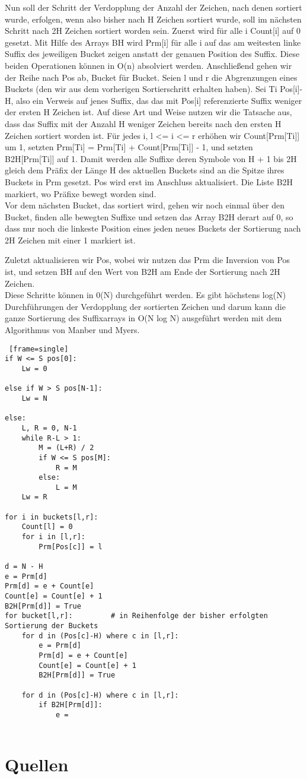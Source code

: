 \documentclass[twoside]{article}
\begin{document}
Nun soll der Schritt der Verdopplung der Anzahl der Zeichen, nach denen sortiert
wurde, erfolgen, wenn also bisher nach H Zeichen sortiert wurde, soll im nächsten
Schritt nach 2H Zeichen sortiert worden sein.
Zuerst wird für alle i Count[i] auf 0 gesetzt. Mit Hilfe des Arrays BH wird Prm[i]
für alle i auf das am weitesten linke Suffix des jeweiligen Bucket zeigen anstatt
der genauen Position des Suffix. Diese beiden Operationen können in O(n) absolviert werden.
Anschließend gehen wir der Reihe nach Pos ab, Bucket für Bucket. Seien l und r
die Abgrenzungen eines Buckets (den wir aus dem vorherigen Sortierschritt erhalten haben).
Sei Ti Pos[i]-H, also ein Verweis auf jenes Suffix, das das mit Pos[i] referenzierte
Suffix weniger der ersten H Zeichen ist. Auf diese Art und Weise nutzen wir die
Tatsache aus, dass das Suffix mit der Anzahl H weniger Zeichen bereits nach den
ersten H Zeichen sortiert worden ist. Für jedes i, l <= i <= r erhöhen wir Count[Prm[Ti]]
um 1, setzten Prm[Ti] = Prm[Ti] + Count[Prm[Ti]] - 1, und setzten B2H[Prm[Ti]]
auf 1.
Damit werden alle Suffixe deren Symbole von H + 1 bis 2H gleich dem Präfix der
Länge H des aktuellen Buckets sind an die Spitze ihres Buckets in Prm gesetzt.
Pos wird erst im Anschluss aktualisiert. Die Liste B2H markiert, wo Präfixe
bewegt worden sind. \\

Vor dem nächsten Bucket, das sortiert wird, gehen wir noch einmal über den Bucket,
finden alle bewegten Suffixe und setzen das Array B2H derart auf 0, so dass nur
noch die linkeste Position eines jeden neues Buckets der Sortierung nach 2H Zeichen
mit einer 1 markiert ist.

Zuletzt aktualisieren wir Pos, wobei wir nutzen das Prm die Inversion von Pos ist,
und setzen BH auf den Wert von B2H am Ende der Sortierung nach 2H Zeichen. \\

Diese Schritte können in 0(N) durchgeführt werden. Es gibt höchstens log(N)
Durchführungen der Verdopplung der sortierten Zeichen und darum kann die ganze
Sortierung des Suffixarrays in O(N log N) ausgeführt werden mit dem Algorithmus
von Manber und Myers.

\begin{lstlisting} [frame=single]
if W <= S pos[0]:
    Lw = 0

else if W > S pos[N-1]:
    Lw = N

else:
    L, R = 0, N-1
    while R-L > 1:
        M = (L+R) / 2
        if W <= S pos[M]:
            R = M
        else:
            L = M
    Lw = R

for i in buckets[l,r]:
    Count[l] = 0
    for i in [l,r]:
        Prm[Pos[c]] = l

d = N - H
e = Prm[d]
Prm[d] = e + Count[e]
Count[e] = Count[e] + 1
B2H[Prm[d]] = True
for bucket[l,r]:         # in Reihenfolge der bisher erfolgten Sortierung der Buckets
    for d in (Pos[c]-H) where c in [l,r]:
        e = Prm[d]
        Prm[d] = e + Count[e]
        Count[e] = Count[e] + 1
        B2H[Prm[d]] = True

    for d in (Pos[c]-H) where c in [l,r]:
        if B2H[Prm[d]]:
            e = 


\end{lstlisting}


\section{Quellen}


\end{document}
